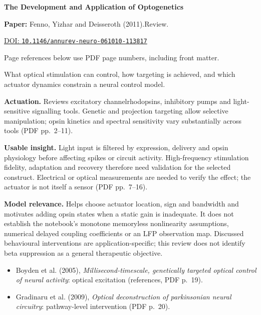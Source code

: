

{\Large\bfseries The Development and Application of Optogenetics\par}

\textbf{Paper:} Fenno, Yizhar and Deisseroth (2011).\quad Review.\par
\href{https://doi.org/10.1146/annurev-neuro-061010-113817}{DOI: \nolinkurl{10.1146/annurev-neuro-061010-113817}}\par
{\footnotesize Page references below use PDF page numbers, including front matter.}

What optical stimulation can control, how targeting is achieved, and which actuator dynamics constrain a neural control model.

\textbf{Actuation.} Reviews excitatory channelrhodopsins, inhibitory pumps and light-sensitive signalling tools. Genetic and projection targeting allow selective manipulation; opsin kinetics and spectral sensitivity vary substantially across tools (PDF pp.~2--11).

\textbf{Usable insight.} Light input is filtered by expression, delivery and opsin physiology before affecting spikes or circuit activity. High-frequency stimulation fidelity, adaptation and recovery therefore need validation for the selected construct. Electrical or optical measurements are needed to verify the effect; the actuator is not itself a sensor (PDF pp.~7--16).

\textbf{Model relevance.} Helps choose actuator location, sign and bandwidth and motivates adding opsin states when a static gain is inadequate. It does not establish the notebook's monotone memoryless nonlinearity assumptions, numerical delayed coupling coefficients or an LFP observation map. Discussed behavioural interventions are application-specific; this review does not identify beta suppression as a general therapeutic objective.

\begin{itemize}
\item Boyden et al. (2005), \emph{Millisecond-timescale, genetically targeted optical control of neural activity}: optical excitation (references, PDF p.~19).
\item Gradinaru et al. (2009), \emph{Optical deconstruction of parkinsonian neural circuitry}: pathway-level intervention (PDF p.~20).
\end{itemize}


